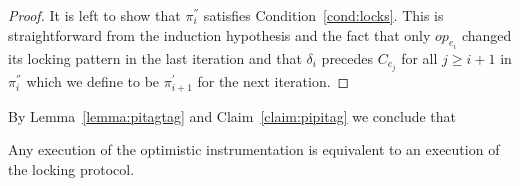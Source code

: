 {\begin{proof}
It is left to show that $\pi_i^{''}$ satisfies Condition~\ref{cond:locks}. 
This is straightforward from the induction hypothesis and the fact that only
$op_{e_i}$ changed its locking pattern in the last iteration and that
$\delta_i$ precedes $C_{e_j}$ for all $j\geq i+1$ in $\pi_i^{''}$ which we
define to be $\pi_{i+1}^{'}$ for the next iteration.
 
\end{proof}

By Lemma~\ref{lemma:pitagtag} and Claim~\ref{claim:pipitag} we conclude that
\begin{theorem}
Any execution of the optimistic instrumentation is equivalent to an
execution of the locking protocol.
\end{theorem}

}

